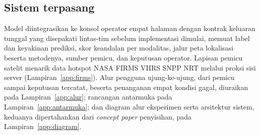 \subsection{Sistem terpasang}

Model diintegrasikan ke konsol operator empat halaman dengan kontrak keluaran
tunggal yang disepakati lintas-tim sebelum implementasi dimulai, memuat label
dan keyakinan prediksi, skor keandalan per modalitas, jalur peta lokalisasi
beserta metodenya, sumber pemicu, dan keputusan operator. Lapisan pemicu satelit
menarik data hotspot NASA FIRMS VIIRS SNPP NRT melalui proksi sisi server
(Lampiran~\ref{app:firms}). Alur pengguna ujung-ke-ujung, dari pemicu sampai
keputusan tercatat, beserta penanganan empat kondisi gagal, diuraikan pada
Lampiran~\ref{app:alur}; rancangan antarmuka pada Lampiran~\ref{app:antarmuka};
dan diagram alur eksperimen serta arsitektur sistem, keduanya dipertahankan dari
\emph{concept paper} penyisihan, pada Lampiran~\ref{app:diagram}.
